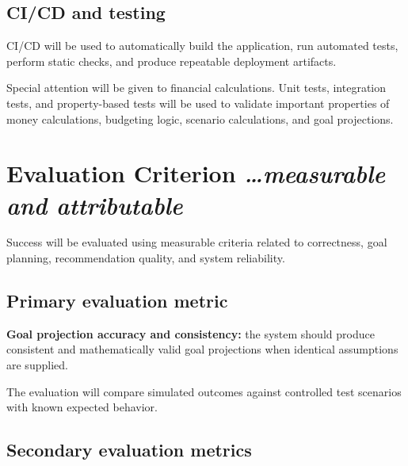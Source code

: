 \documentclass[11pt,a4paper]{article}
\newcommand{\BvrHint}[1]{%
  {\normalfont\normalsize\itshape\hfill #1}}
\begin{document}
\subsection{CI/CD and testing}

CI/CD will be used to automatically build the application, run automated
tests, perform static checks, and produce repeatable deployment artifacts.

Special attention will be given to financial calculations. Unit tests,
integration tests, and property-based tests will be used to validate important
properties of money calculations, budgeting logic, scenario calculations, and
goal projections.


\section{Evaluation Criterion%
  \BvrHint{\ldots measurable and attributable}}

Success will be evaluated using measurable criteria related to correctness,
goal planning, recommendation quality, and system reliability.


\subsection{Primary evaluation metric}

\textbf{Goal projection accuracy and consistency:} the system should produce
consistent and mathematically valid goal projections when identical assumptions
are supplied.

The evaluation will compare simulated outcomes against controlled test
scenarios with known expected behavior.


\subsection{Secondary evaluation metrics}
\end{document}
